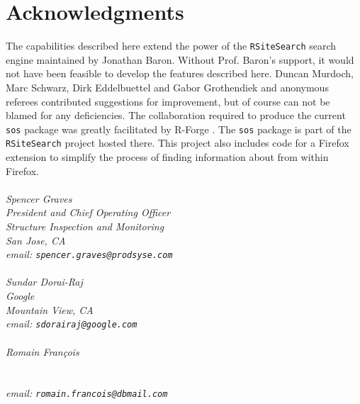 \section*{Acknowledgments}
The capabilities described here extend the power of the
{\tt RSiteSearch} search engine maintained by Jonathan Baron.
Without Prof. Baron's support, it would not have been feasible
to develop the features described here.  Duncan Murdoch, Marc Schwarz,
Dirk Eddelbuettel and Gabor Grothendiek and anonymous
referees contributed suggestions for improvement, but of course
can not be blamed for any deficiencies.  The collaboration
required to produce the current {\tt sos} package was greatly
facilitated by R-Forge \citep{RFORGE09URL}. The {\tt sos} package
is part of the {\tt RSiteSearch} project hosted there.  This project
also includes code for a Firefox extension to simplify the process of
finding information about \R{} from within Firefox.
\\ \\
\emph{Spencer Graves \\
President and Chief Operating Officer \\
Structure Inspection and Monitoring \\
San Jose, CA \\
email:  {\tt spencer.graves@prodsyse.com} }
\\ \\
\emph{Sundar Dorai-Raj \\
Google \\
Mountain View, CA \\
email:  {\tt sdorairaj@google.com} }
\\ \\
\emph{Romain Fran{\c c}ois \\
\\
\\
email:  {\tt romain.francois@dbmail.com} }
